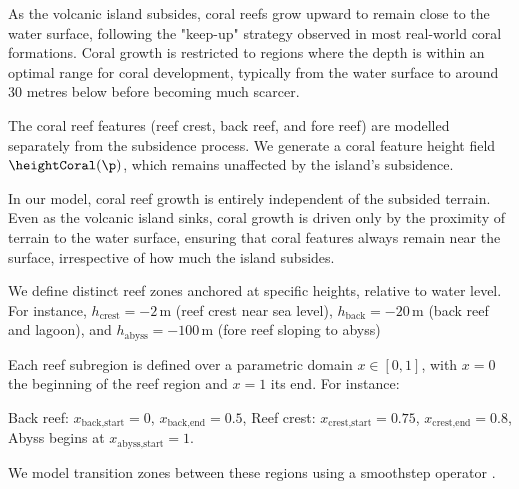 As the volcanic island subsides, coral reefs grow upward to remain close to the water surface, following the "keep-up" strategy observed in most real-world coral formations. Coral growth is restricted to regions where the depth is within an optimal range for coral development, typically from the water surface to around 30 metres below before becoming much scarcer.

The coral reef features (reef crest, back reef, and fore reef) are modelled separately from the subsidence process. We generate a coral feature height field $\heightCoral(\p)$, which remains unaffected by the island's subsidence. %

In our model, coral reef growth is entirely independent of the subsided terrain. Even as the volcanic island sinks, coral growth is driven only by the proximity of terrain to the water surface, ensuring that coral features always remain near the surface, irrespective of how much the island subsides.

We define distinct reef zones anchored at specific heights, relative to water level. For instance, $h_{\text{crest}} = -2$\,m (reef crest near sea level), $h_{\text{back}} = -20$\,m (back reef and lagoon), and $h_{\text{abyss}} = -100$\,m (fore reef sloping to abyss)

Each reef subregion is defined over a parametric domain $x \in [0, 1]$, with $x = 0$ the beginning of the reef region and $x = 1$ its end. %
For instance:
\begin{Itemize}
    \Item{} Back reef: $x_{\text{back,start}} = 0$, $x_{\text{back,end}} = 0.5$,
    \Item{} Reef crest: $x_{\text{crest,start}} = 0.75$, $x_{\text{crest,end}} = 0.8$,
    \Item{} Abyss begins at $x_{\text{abyss,start}} = 1$.
\end{Itemize}

We model transition zones between these regions using a smoothstep operator \cite{Perlin2002}. %



